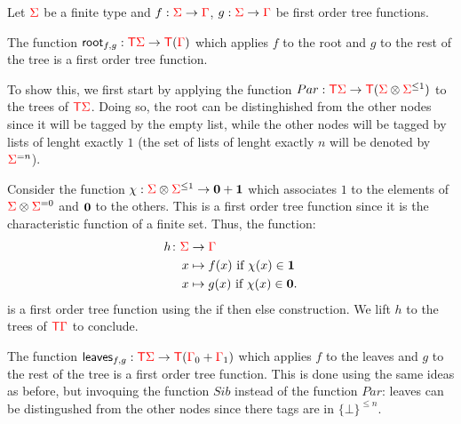\bigskip
\noindent  \begin{example} Let ${\color{red}{\Sigma}}$ be a finite type and $f:{\color{red}{\Sigma}} \to {\color{red}{\Gamma}}$, $g: {\color{red}{\Sigma}} \to {\color{red}{\Gamma}}$ be first order tree functions. 

The function $\mathsf{root}_{f,g} : {\color{red}{\mathsf T}}{\color{red}{\Sigma}} \to {\color{red}{\mathsf T}}({\color{red}{\Gamma}})$
which applies $f$ to the root and $g$ to the rest of the tree is a first order tree function.
 
To show this, we first start by applying the function $Par:{\color{red}{\mathsf T}}{\color{red}{\Sigma}}\to{\color{red}{\mathsf T}}({\color{red}{\Sigma}}\otimes{\color{red}{\Sigma}}^{\leq 1})$ to the trees of ${\color{red}{\mathsf T}} {\color{red}{\Sigma}}$. Doing so, the root can be distinghished from the other nodes since it will be tagged by the empty list, while the other nodes will be tagged by lists of lenght exactly $1$ (the set of lists of lenght exactly $n$ will be denoted by ${\color{red}{\Sigma}}^{=n}$).  

Consider the function $\chi:{\color{red}{\Sigma}}\otimes{\color{red}{\Sigma}}^{\leq 1}\to \mathbf{0}+\mathbf{1}$ which associates $1$ to the elements of ${\color{red}{\Sigma}}\otimes {\color{red}{\Sigma}}^{=0}$ and $\mathbf{0}$ to the others.  This is a
first order tree function since it is the characteristic function of a finite set.  Thus, the function: 
\begin{align*}
  h\colon {\color{red}{\Sigma}} &\to {\color{red}{\Gamma}} \\
  x &\mapsto f(x)  \text{ if } \chi(x)\in\mathbf{1}\\
  x &\mapsto g(x)  \text{ if } \chi(x)\in\mathbf{0}.
\end{align*}
is a first order tree function using the if then else construction. 
We lift $h$ to the trees of ${\color{red}{\mathsf T}}{\color{red}{\Gamma}}$ to conclude.



\medskip
The function $\mathsf{leaves}_{f,g} : {\color{red}{\mathsf T}}{\color{red}{\Sigma}} \to {\color{red}{\mathsf T}}({\color{red}{\Gamma}}_0 + {\color{red}{\Gamma}}_1)$
 which applies $f$ to the leaves and $g$ to the rest of the tree is a first order tree function. This is done using the same ideas as before, but invoquing the function $Sib$ instead of the function $Par$: leaves can be distingushed from the other nodes since there tags are in $\{\bot\}^{\leq n}$.
\end{example}


